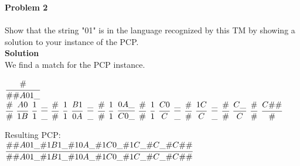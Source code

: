 \documentclass{article}
\newcommand{\domino}[2]{\left [ \cfrac{#1}{#2} \right ]}
\newcommand{\tile}[2]{\cfrac{#1}{#2}}
\newcommand{\problem}[1]{\large{\textbf{Problem #1}}\\}
\begin{document}
\pagebreak

\problem{2} \\
Show that the string "01" is in the language recognized by this TM by showing a solution to your instance of the PCP.\\

\textbf{Solution} \\
We find a match for the PCP instance.
%
\vspace{1cm}

\begin{adjustbox}{width=1\textwidth,center}
$\tile{\#}{\#\#A01\_}$ \\
$\tile{\#}{\#}$
$\tile{A0}{1B}$
$\tile{1}{1}$
$\tile{\_}{\_}$
$\tile{\#}{\#}$
$\tile{1}{1}$
$\tile{B1}{0A}$
$\tile{\_}{\_}$
$\tile{\#}{\#}$
$\tile{1}{1}$
$\tile{0A\_}{C0\_}$
$\tile{\#}{\#}$
$\tile{1}{1}$
$\tile{C0}{C}$ 
$\tile{\_}{\_}$
$\tile{\#}{\#}$
$\tile{1C}{C}$ 
$\tile{\_}{\_}$
$\tile{\#}{\#}$
$\tile{C\_}{C}$
$\tile{\#}{\#}$
$\tile{C\#\#}{\#}$
\end{adjustbox}

\vspace{1cm}

Resulting PCP: \\

$\cfrac{\#\#A01\_\#1B1\_\#10A\_\#1C0\_\#1C\_\#C\_\#C\#\#}{\#\#A01\_\#1B1\_\#10A\_\#1C0\_\#1C\_\#C\_\#C\#\#}$
\end{document}
